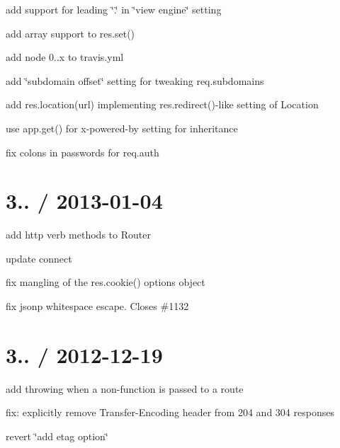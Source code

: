 {\ttfamily 
\begin{DoxyItemize}
\item add support for leading \char`\"{}.\char`\"{} in \char`\"{}view engine\char`\"{} setting
\item add array support to {\ttfamily res.\+set()}
\item add node 0..\+x to travis.\+yml
\item add \char`\"{}subdomain offset\char`\"{} setting for tweaking {\ttfamily req.\+subdomains}
\item add {\ttfamily res.\+location(url)} implementing {\ttfamily res.\+redirect()}-\/like setting of Location
\item use app.\+get() for x-\/powered-\/by setting for inheritance
\item fix colons in passwords for {\ttfamily req.\+auth}
\end{DoxyItemize}}

{\ttfamily \section*{3.. / 2013-\/01-\/04 }}

{\ttfamily }

{\ttfamily 
\begin{DoxyItemize}
\item add http verb methods to Router
\item update connect
\item fix mangling of the {\ttfamily res.\+cookie()} options object
\item fix jsonp whitespace escape. Closes \#1132
\end{DoxyItemize}}

{\ttfamily \section*{3.. / 2012-\/12-\/19 }}

{\ttfamily }

{\ttfamily 
\begin{DoxyItemize}
\item add throwing when a non-\/function is passed to a route
\item fix\+: explicitly remove Transfer-\/\+Encoding header from 204 and 304 responses
\item revert \char`\"{}add \textquotesingle{}etag\textquotesingle{} option\char`\"{}
\end{DoxyItemize}}

